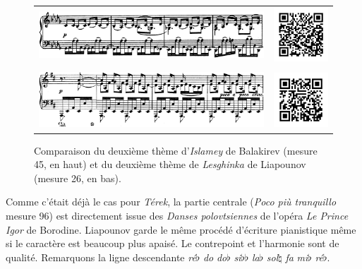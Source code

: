 \begin{figure}[!ht]
  \begin{bigcenter}
    \begin{tabular}{lr}
      \vspace*{0.0cm}
      \includegraphics[width=12.5cm, keepaspectratio]{islamey.png}
      &
      \includegraphics[width=3cm, keepaspectratio]{islamey-qr.png}
      \\
      \vspace{0.5cm} &
      \\
      \includegraphics[width=12.5cm, keepaspectratio]{lesghinka-theme2.png}
      &
      \includegraphics[width=3cm, keepaspectratio]{op11-qr.png}
    \end{tabular}
  \end{bigcenter}
  \caption{\label{lesghinka-2}Comparaison du deuxième thème d'\emph{Islamey} de Balakirev (mesure 45, en haut) et du deuxième thème de \emph{Lesghinka} de Liapounov (mesure 26, en bas).}
\end{figure}

Comme c'était déjà le cas pour \emph{Térek}, la partie centrale (\emph{Poco pi\`{u} tranquillo} mesure 96) est directement issue des \emph{Danses polovtsiennes} de l'opéra \emph{Le Prince Igor} de Borodine. Liapounov garde le même procédé d'écriture pianistique même si le caractère est beaucoup plus apaisé. Le contrepoint et l'harmonie sont de qualité. Remarquons la ligne descendante \emph{ré}$\flat$ \emph{do} \emph{do}$\flat$ \emph{si}$\flat\flat$ \emph{la}$\flat$ \emph{sol}$\natural$ \emph{fa} \emph{mi}$\flat$ \emph{ré}$\flat$. \\

